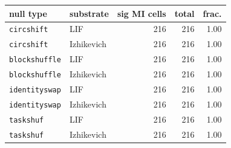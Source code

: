 \begin{tabular}{llrrr}
\toprule
null type & substrate & sig MI cells & total & frac. \\
\midrule
\texttt{circshift} & LIF & 216 & 216 & 1.00 \\
\texttt{circshift} & Izhikevich & 216 & 216 & 1.00 \\
\texttt{blockshuffle} & LIF & 216 & 216 & 1.00 \\
\texttt{blockshuffle} & Izhikevich & 216 & 216 & 1.00 \\
\texttt{identityswap} & LIF & 216 & 216 & 1.00 \\
\texttt{identityswap} & Izhikevich & 216 & 216 & 1.00 \\
\texttt{taskshuf} & LIF & 216 & 216 & 1.00 \\
\texttt{taskshuf} & Izhikevich & 216 & 216 & 1.00 \\
\bottomrule
\end{tabular}


